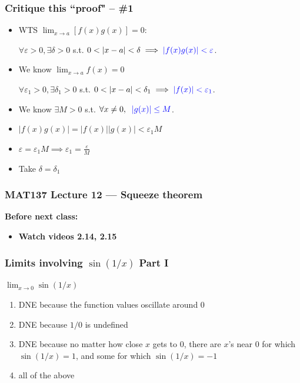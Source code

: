 \documentclass[14pt]{beamer}
\newcommand {\DS} [1] {${\displaystyle #1}$}
\newcommand{\e}{\varepsilon}
\newcommand{\azul}[1]{{\color{blue} #1}}
\newcommand{\setsize}[1]{\fontsize{#1}{#1}\selectfont} %
\newcommand{\smallerfont}{\setsize{13}} %
\begin{document}
\begin{frame}[t]
\frametitle{Critique this ``proof" -- \#1}
\smallerfont
\begin{itemize}
	\item  WTS \DS{\lim_{x \to a} \left[ f(x) g(x) \right] = 0}:
	
		\hfill \DS{\forall \e>0, \exists \delta>0} \; s.t. \; \DS{0<|x-a|<\delta \implies \azul{|f(x) g(x)| < \e}}. 
\vfill	
	\item  We know \DS{\lim_{x \to a} f(x) = 0}
	
		\hfill \DS{\forall \e_1>0, \exists \delta_1 >0 } \; s.t. \; \DS{0<|x-a|<\delta_1 \implies \azul{|f(x)| <\e_1}}.
\vfill
	\item   We know \hfill \DS{\exists M>0} \; s.t. \; \DS{\forall x \neq 0, \; \; \azul{|g(x)| \leq M}}.
\vfill
	\item  \DS{|f(x)g(x)| = |f(x)||g(x)| < \e_1 M}
\vfill
	\item \DS{\e = \e_1 M \implies \e_1 = \frac{\e}{M}}
\vfill
	\item Take  \DS{\delta = \delta_1}
\vfill
\end{itemize}
\end{frame}


\begin{frame}
\frametitle{MAT137 Lecture 12 --- Squeeze theorem}
	{\bf Before next class:}
		\begin{itemize} \normalsize
			\item {\bf Watch videos 2.14, 2.15 }
		\end{itemize}
	\vfill

\end{frame}


\begin{frame}[t]
\frametitle{Limits involving \DS{\sin(1/x)} Part I}

\begin{block}{
		\DS{{\lim_{x\rightarrow 0}\sin (1/x)\phantom{x^2}}}}

\begin{enumerate}
\item DNE because the function values oscillate around $0$
\item DNE because $1/0$ is undefined
\item DNE because no matter how close $x$ gets to $0$, there are $x$'s near $0$ for which $\sin(1/x) =1$, and some for which $\sin (1/x)=-1$
\item all of the above
\end{enumerate}

\end{block}

\end{frame}
\end{document}
